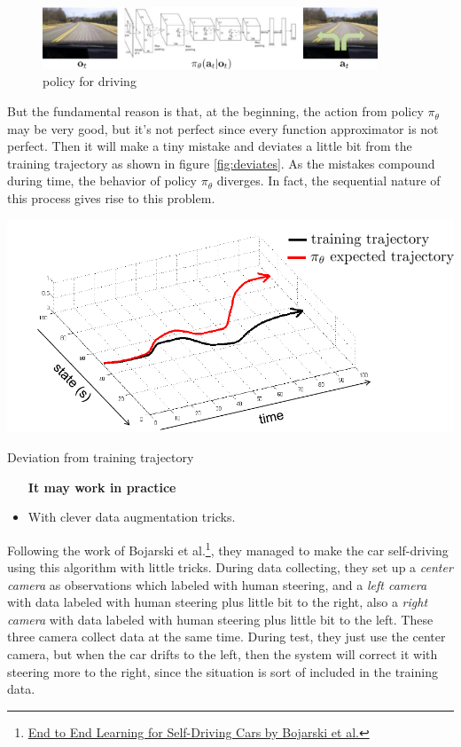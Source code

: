 \documentclass[nobib]{tufte-handout}
\begin{document}
\begin{figure}
  \includegraphics[width=10cm]{drive}
  \caption{policy for driving}
  \label{fig:drive}
\end{figure}

But the fundamental reason is that, at the beginning, the action from policy $\pi_\theta$ may be very good, but it's not perfect since every function approximator is not perfect. Then it will make a tiny mistake and deviates a little bit from the training trajectory as shown in figure \ref{fig:deviates}.
As the mistakes compound during time, the behavior of policy $\pi_\theta$ diverges. In fact, the sequential nature of this process gives rise to this problem.

\begin{marginfigure}
  \centering
  \includegraphics[width=\linewidth]{deviates}
  \caption{Deviation from training trajectory}
  \label{fig:deviates}
\end{marginfigure}

\begin{itemize}
  \item[\textbf{It may work in practice}]
  \item With clever data augmentation tricks.
\end{itemize}

Following the work of Bojarski et al.\thanks{\href{https://arxiv.org/abs/1604.07316}{End to End Learning for Self-Driving Cars by Bojarski et al.}}, they managed to make the car self-driving using this algorithm with little tricks. During data collecting, they set up a \emph{center camera} as observations which labeled with human steering, and a \emph{left camera} with data labeled with human steering plus little bit to the right, also a \emph{right camera} with data labeled with human steering plus little bit to the left. These three camera collect data at the same time. During test, they just use the center camera, but when the car drifts to the left, then the system will correct it with steering more to the right, since the situation is sort of included in the training data.
\end{document}
